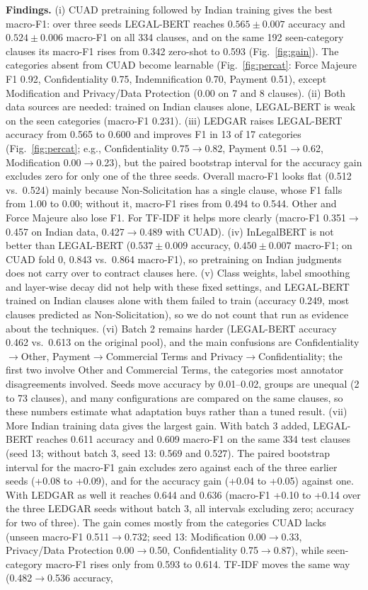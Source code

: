 \documentclass[conference]{IEEEtran}
\begin{document}
\textbf{Findings.} (i) CUAD pretraining followed by Indian training gives the best macro-F1: over three seeds LEGAL-BERT reaches $0.565\pm0.007$ accuracy and $0.524\pm0.006$ macro-F1 on all 334 clauses, and on the same 192 seen-category clauses its macro-F1 rises from 0.342 zero-shot to 0.593 (Fig.~\ref{fig:gain}). The categories absent from CUAD become learnable (Fig.~\ref{fig:percat}: Force Majeure F1 0.92, Confidentiality 0.75, Indemnification 0.70, Payment 0.51), except Modification and Privacy/Data Protection (0.00 on 7 and 8 clauses). (ii) Both data sources are needed: trained on Indian clauses alone, LEGAL-BERT is weak on the seen categories (macro-F1 0.231). (iii) LEDGAR raises LEGAL-BERT accuracy from 0.565 to 0.600 and improves F1 in 13 of 17 categories (Fig.~\ref{fig:percat}; e.g., Confidentiality 0.75$\rightarrow$0.82, Payment 0.51$\rightarrow$0.62, Modification 0.00$\rightarrow$0.23), but the paired bootstrap interval for the accuracy gain excludes zero for only one of the three seeds. Overall macro-F1 looks flat (0.512 vs.\ 0.524) mainly because Non-Solicitation has a single clause, whose F1 falls from 1.00 to 0.00; without it, macro-F1 rises from 0.494 to 0.544. Other and Force Majeure also lose F1. For TF-IDF it helps more clearly (macro-F1 0.351$\rightarrow$0.457 on Indian data, 0.427$\rightarrow$0.489 with CUAD). (iv) InLegalBERT is not better than LEGAL-BERT ($0.537\pm0.009$ accuracy, $0.450\pm0.007$ macro-F1; on CUAD fold 0, 0.843 vs.\ 0.864 macro-F1), so pretraining on Indian judgments does not carry over to contract clauses here. (v) Class weights, label smoothing and layer-wise decay did not help with these fixed settings, and LEGAL-BERT trained on Indian clauses alone with them failed to train (accuracy 0.249, most clauses predicted as Non-Solicitation), so we do not count that run as evidence about the techniques. (vi) Batch 2 remains harder (LEGAL-BERT accuracy 0.462 vs.\ 0.613 on the original pool), and the main confusions are Confidentiality$\rightarrow$Other, Payment$\rightarrow$Commercial Terms and Privacy$\rightarrow$Confidentiality; the first two involve Other and Commercial Terms, the categories most annotator disagreements involved. Seeds move accuracy by 0.01--0.02, groups are unequal (2 to 73 clauses), and many configurations are compared on the same clauses, so these numbers estimate what adaptation buys rather than a tuned result. (vii) More Indian training data gives the largest gain. With batch 3 added, LEGAL-BERT reaches 0.611 accuracy and 0.609 macro-F1 on the same 334 test clauses (seed 13; without batch 3, seed 13: 0.569 and 0.527). The paired bootstrap interval for the macro-F1 gain excludes zero against each of the three earlier seeds (+0.08 to +0.09), and for the accuracy gain (+0.04 to +0.05) against one. With LEDGAR as well it reaches 0.644 and 0.636 (macro-F1 +0.10 to +0.14 over the three LEDGAR seeds without batch 3, all intervals excluding zero; accuracy for two of three). The gain comes mostly from the categories CUAD lacks (unseen macro-F1 0.511$\rightarrow$0.732; seed 13: Modification 0.00$\rightarrow$0.33, Privacy/Data Protection 0.00$\rightarrow$0.50, Confidentiality 0.75$\rightarrow$0.87), while seen-category macro-F1 rises only from 0.593 to 0.614. TF-IDF moves the same way (0.482$\rightarrow$0.536 accuracy, 
\end{document}
